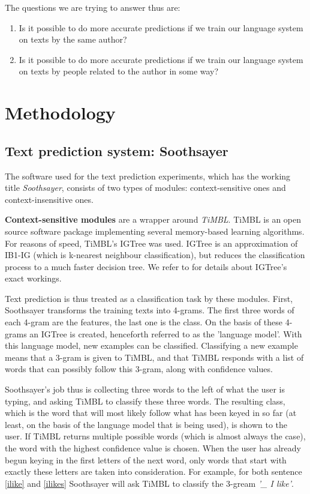 \documentclass[11pt]{article}
\begin{document}
The questions we are trying to answer thus are:

\begin{enumerate}
\item Is it possible to do more accurate predictions if we train our language system on texts by the same author?
\item Is it possible to do more accurate predictions if we train our language system on texts by people related to the author in some way?
\end{enumerate}

\section{Methodology}

\subsection{Text prediction system: Soothsayer}

The software used for the text prediction experiments, which has the working title \emph{Soothsayer}, consists of two types of modules: context-sensitive ones and context-insensitive ones. 

\textbf{Context-sensitive modules} are a wrapper around \emph{TiMBL}. TiMBL is an open source software package implementing several memory-based learning algorithms. For reasons of speed, TiMBL's IGTree was used. IGTree is an approximation of IB1-IG (which is k-nearest neighbour classification), but reduces the classification process to a much faster decision tree. We refer to  for details about IGTree's exact workings.

Text prediction is thus treated as a classification task by these modules. First, Soothsayer transforms the training texts into 4-grams. The first three words of each 4-gram are the features, the last one is the class. On the basis of these 4-grams an IGTree is created, henceforth referred to as the 'language model'. With this language model, new examples can be classified. Classifying a new example means that a 3-gram is given to TiMBL, and that TiMBL responds with a list of words that can possibly follow this 3-gram, along with confidence values. 

Soothsayer's job thus is collecting three words to the left of what the user is typing, and asking TiMBL to classify these three words. The resulting class, which is the word that will most likely follow what has been keyed in so far (at least, on the basis of the language model that is being used), is shown to the user. If TiMBL returns multiple possible words (which is almost always the case), the word with the highest confidence value is chosen. When the user has already begun keying in the first letters of the next word, only words that start with exactly these letters are taken into consideration. For example, for both sentence \ref{ilike} and \ref{ilikes} Soothsayer will ask TiMBL to classify the 3-gream \emph{'\_ I like'}.
\end{document}
